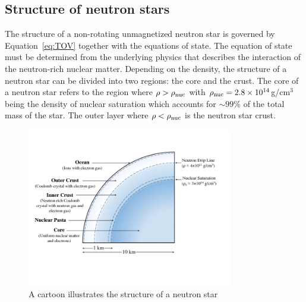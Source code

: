  \subsection{Structure of neutron stars}
 \label{sec:intro-structure}
 
The structure of a non-rotating unmagnetized neutron star is governed by Equation~\ref{eq:TOV} together with the equations of state.
The equation of state must be determined from the underlying physics that describes the interaction of the neutron-rich nuclear matter.
Depending on the density, the structure of a neutron star can be divided into two regions: the core and the crust. 
The core of a neutron star refers to the region where $\rho>\rho_{\rm nuc}$ with $\rho_{\rm nuc}=2.8\times 10^{14}$g/cm$^3$ being the density of nuclear saturation which accounts for $\sim 99\%$ of the total mass of the star.
The outer layer where $\rho<\rho_{\rm nuc}$ is the neutron star crust.
%
\begin{figure}[h]
  \centering
  \includegraphics[width=0.8\textwidth]{pics/intro/NS_structure.png}
  \caption[A cartoon illustrates the structure of a neutron star] {A cartoon illustrates the structure of a neutron star \citep{2017RvMP...89d1002C}}
  \label{fig:NS-structure}
\end{figure}
%
